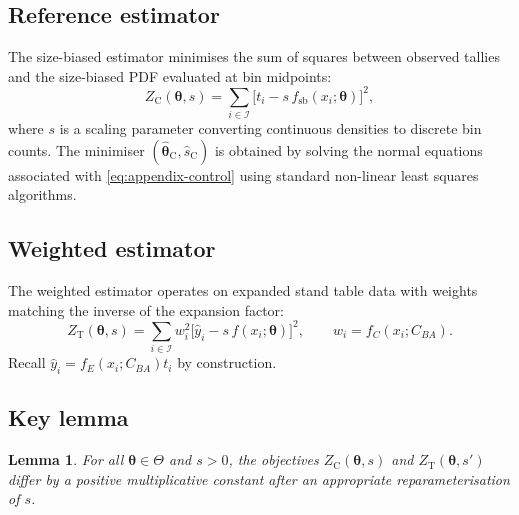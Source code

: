 \documentclass[12pt,letterpaper]{article}
\theoremstyle{plain}
\newtheorem{lemma}{Lemma}
\begin{document}
\subsection*{Reference estimator}

The size-biased estimator minimises the sum of squares between observed tallies
and the size-biased PDF evaluated at bin midpoints:
\begin{equation}
  Z_{\mathrm{C}}(\boldsymbol{\theta}, s)
  =
  \sum_{i \in \mathcal{I}}
  \Big[t_i - s\, f_{\mathrm{sb}}(x_i; \boldsymbol{\theta})\Big]^2,
  \label{eq:appendix-control}
\end{equation}
where $s$ is a scaling parameter converting continuous densities to discrete
bin counts. The minimiser $(\hat{\boldsymbol{\theta}}_{\mathrm{C}},\hat{s}_{\mathrm{C}})$ is
obtained by solving the normal equations associated with
\eqref{eq:appendix-control} using standard non-linear least squares algorithms.

\subsection*{Weighted estimator}

The weighted estimator operates on expanded stand table data with weights
matching the inverse of the expansion factor:
\begin{equation}
  Z_{\mathrm{T}}(\boldsymbol{\theta}, s)
  =
  \sum_{i \in \mathcal{I}}
  w_i^2
  \Big[\hat{y}_i - s\, f(x_i; \boldsymbol{\theta})\Big]^2,
  \qquad
  w_i = f_C(x_i; C_{BA}).
  \label{eq:appendix-test}
\end{equation}
Recall $\hat{y}_i = f_E(x_i; C_{BA}) t_i$ by construction.

\subsection*{Key lemma}

\begin{lemma}
For all $\boldsymbol{\theta}\in\Theta$ and $s>0$, the objectives
$Z_{\mathrm{C}}(\boldsymbol{\theta}, s)$ and $Z_{\mathrm{T}}(\boldsymbol{\theta}, s')$ differ
by a positive multiplicative constant after an appropriate reparameterisation of
$s$.
\end{lemma}
\end{document}
